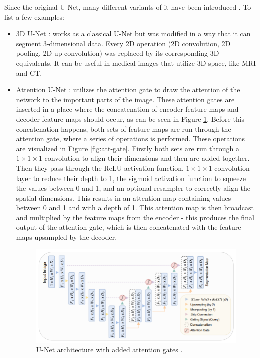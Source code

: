 Since the original U-Net, many different variants of it have been introduced \cite{Siddique2021}. To list a few examples:

\begin{itemize}
    \item 3D U-Net \cite{Çiçek2016}: works as a classical U-Net but was modified in a way that it can segment 3-dimensional data. Every 2D operation (2D convolution, 2D pooling, 2D up-convolution) was replaced by its corresponding 3D equivalents. It can be useful in medical images that utilize 3D space, like MRI and CT.
    \item Attention U-Net \cite{Oktay2018}: utilizes the attention gate to draw the attention of the network to the important parts of the image. These attention gates are inserted in a place where the concatenation of encoder feature maps and decoder feature maps should occur, as can be seen in Figure \ref{fig:att-unet}. Before this concatenation happens, both sets of feature maps are run through the attention gate, where a series of operations is performed. These operations are visualized in Figure \ref{fig:att-gate}. Firstly both sets are run through a $1\!\times\!1\!\times\!1$ convolution to align their dimensions and then are added together. Then they pass through the ReLU activation function, $1\!\times\!1\!\times\!1$ convolution layer to reduce their depth to 1, the sigmoid activation function to squeeze the values between 0 and 1, and an optional resampler to correctly align the spatial dimensions. This results in an attention map containing values between 0 and 1 and with a depth of 1. This attention map is then broadcast and multiplied by the feature maps from the encoder - this produces the final output of the attention gate, which is then concatenated with the feature maps upsampled by the decoder.

    \begin{figure}[H]
    \begin{centering}
    \includegraphics[width=12cm]{assets/images/att-unet.png}
    \par\end{centering}
    \caption{U-Net architecture with added attention gates \cite{Oktay2018}.}
    \label{fig:att-unet}
    \end{figure}


\end{itemize}
